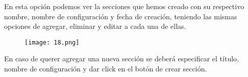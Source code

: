 \documentclass[12pt]{article}
\begin{document}
En esta opción podemos ver la secciones que hemos creado con su respectivo nombre, nombre de configuración y fecha de creación, teniendo las mismas opciones de agregar, eliminar y editar a cada una de ellas.\\

\begin{figure}[H]
  \centering
  \texttt{[image: 18.png]}
  
\end{figure}

En caso de querer agregar una nueva sección se deberá especificar el título, nombre de configuración y dar click en el botón de crear sección.
\end{document}
